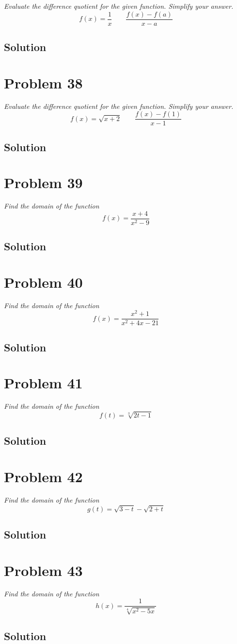 \documentclass[11pt]{article}
\newcommand{\soln}{\subsection*}
\newcommand{\qn}{\textit}
\begin{document}
\qn{Evaluate the difference quotient for the given function. Simplify your answer. $$f(x)=\frac{1}{x} \qquad \frac{f(x)-f(a)}{x-a}$$}

\soln{Solution}

\section*{Problem 38}

\qn{Evaluate the difference quotient for the given function. Simplify your answer. $$f(x)=\sqrt{x+2} \qquad \frac{f(x)-f(1)}{x-1}$$}

\soln{Solution}

\section*{Problem 39}

\qn{Find the domain of the function $$f(x)=\frac{x+4}{x^2-9}$$}

\soln{Solution}

\section*{Problem 40}

\qn{Find the domain of the function $$f(x)=\frac{x^2+1}{x^2+4x-21}$$}

\soln{Solution}

\section*{Problem 41}

\qn{Find the domain of the function $$f(t)=\sqrt[3]{2t-1}$$}

\soln{Solution}

\section*{Problem 42}

\qn{Find the domain of the function $$g(t)=\sqrt{3-t}-\sqrt{2+t}$$}

\soln{Solution}

\section*{Problem 43}

\qn{Find the domain of the function $$h(x)=\frac{1}{\sqrt[4]{x^2-5x}}$$}

\soln{Solution}
\end{document}
